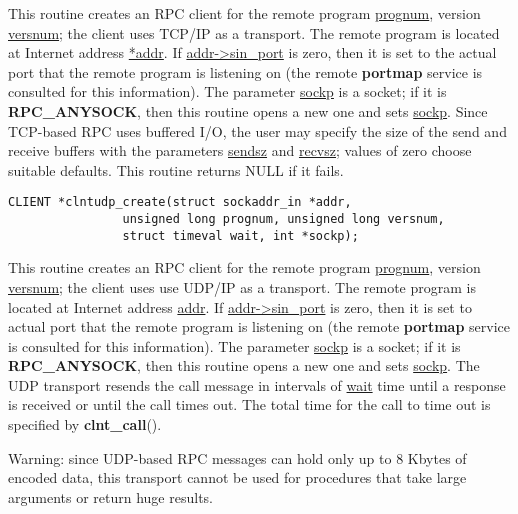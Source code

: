 \documentclass[]{article}
\let\realtextbf=\textbf
\renewcommand{\textbf}[1]{\textcolor{boldcolor}{\realtextbf{#1}}}
\renewcommand{\emph}[1]{\underline{#1}}
\begin{document}
\begin{description}
\itemsep1pt\parskip0pt
\item[]
This routine creates an RPC client for the remote program
\emph{prognum}, version \emph{versnum}; the client uses TCP/IP as a
transport. The remote program is located at Internet address
\emph{*addr}. If \emph{addr-\textgreater{}sin\_port} is zero, then it is
set to the actual port that the remote program is listening on (the
remote \textbf{portmap} service is consulted for this information). The
parameter \emph{sockp} is a socket; if it is \textbf{RPC\_ANYSOCK}, then
this routine opens a new one and sets \emph{sockp}. Since TCP-based RPC
uses buffered I/O, the user may specify the size of the send and receive
buffers with the parameters \emph{sendsz} and \emph{recvsz}; values of
zero choose suitable defaults. This routine returns NULL if it fails.
\end{description}

\begin{verbatim}
CLIENT *clntudp_create(struct sockaddr_in *addr,
                unsigned long prognum, unsigned long versnum,
                struct timeval wait, int *sockp);
\end{verbatim}

\begin{description}
\itemsep1pt\parskip0pt
\item[]
This routine creates an RPC client for the remote program
\emph{prognum}, version \emph{versnum}; the client uses use UDP/IP as a
transport. The remote program is located at Internet address
\emph{addr}. If \emph{addr-\textgreater{}sin\_port} is zero, then it is
set to actual port that the remote program is listening on (the remote
\textbf{portmap} service is consulted for this information). The
parameter \emph{sockp} is a socket; if it is \textbf{RPC\_ANYSOCK}, then
this routine opens a new one and sets \emph{sockp}. The UDP transport
resends the call message in intervals of \emph{wait} time until a
response is received or until the call times out. The total time for the
call to time out is specified by \textbf{clnt\_call}().
\end{description}

\begin{description}
\itemsep1pt\parskip0pt
\item[]
Warning: since UDP-based RPC messages can hold only up to 8 Kbytes of
encoded data, this transport cannot be used for procedures that take
large arguments or return huge results.
\end{description}
\end{document}
